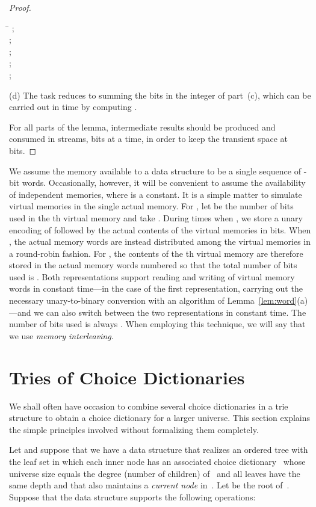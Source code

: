 \documentclass[envcountsame,envcountsect,undated,nolinenumbers]{lnthi}
\begin{document}
\begin{proof}
\begin{tabbing}
\quad\=\kill
\>;\\
\>;\\
\>;\\
\>;\\
\>;
\end{tabbing}

(d) The task reduces to summing the
bits in the integer  of part~(c),
which can be carried out in
 time by computing
.

For all parts of the lemma,
intermediate results should be produced and
consumed in streams,  bits at a time,
in order to keep the transient space at  bits.
\end{proof}

We assume the memory available to a data structure
to be a single sequence of -bit words.
Occasionally, however, it will be convenient to
assume the availability of  independent
memories, where  is a constant.
It is a simple matter to simulate  virtual
memories in the single actual memory.
For , let  be the number
of bits used in the th virtual memory
and take .
During times when , we store a unary encoding
of  followed by the actual
contents of the virtual memories in  bits.
When , the actual memory words are
instead distributed among the  virtual
memories in a round-robin fashion.
For , the contents of the th
virtual memory are therefore stored in the
actual memory words numbered 
so that the total number of bits used is
.
Both representations support reading and writing
of virtual memory words in constant time---in the
case of the first representation,
carrying out the necessary unary-to-binary conversion
with an algorithm of Lemma~\ref{lem:word}(a)---and
we can also switch between the two representations
in constant time.
The number of bits used is always .
When employing this technique, we will say that we use
\emph{memory interleaving}.

\section{Tries of Choice Dictionaries}
\label{sec:trie}

We shall often have occasion to combine several
choice dictionaries in a trie structure to
obtain a choice dictionary
for a larger universe.
This section explains the simple principles
involved without formalizing them completely.

Let  and suppose that we have a data
structure that realizes an ordered tree 
with the leaf set  in which
each inner
node  has an associated choice dictionary~
whose universe size equals the degree
(number of children) of~
and all leaves have the same depth and that
also maintains a \emph{current node} in~.
Let  be the root of~.
Suppose that the data structure supports
the following operations:
\end{document}
